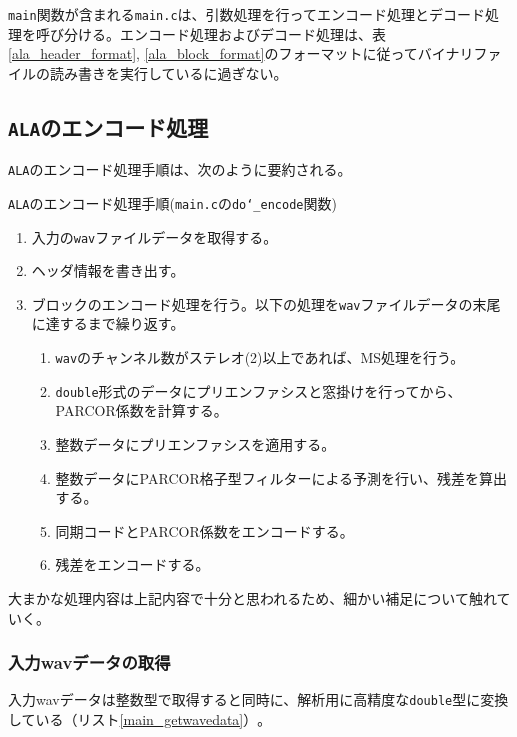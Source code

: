 \documentclass[uplatex,dvipdfmx,b5j,10pt]{jsbook}
\theoremstyle{definition}
\begin{document}
\texttt{main}関数が含まれる\texttt{main.c}は、引数処理を行ってエンコード処理とデコード処理を呼び分ける。エンコード処理およびデコード処理は、表\ref{ala_header_format}, \ref{ala_block_format}のフォーマットに従ってバイナリファイルの読み書きを実行しているに過ぎない。

\subsection{\texttt{ALA}のエンコード処理} \label{description_do_encode}

\texttt{ALA}のエンコード処理手順は、次のように要約される。

\begin{itembox}[l]{\texttt{ALA}のエンコード処理手順(\texttt{main.c}の\texttt{do\char`_encode}関数)}
  \begin{enumerate}
    \item 入力の\texttt{wav}ファイルデータを取得する。
    \item ヘッダ情報を書き出す。
    \item ブロックのエンコード処理を行う。以下の処理を\texttt{wav}ファイルデータの末尾に達するまで繰り返す。
      \begin{enumerate}
        \item \texttt{wav}のチャンネル数がステレオ(2)以上であれば、MS処理を行う。
        \item \texttt{double}形式のデータにプリエンファシスと窓掛けを行ってから、PARCOR係数を計算する。
        \item 整数データにプリエンファシスを適用する。
        \item 整数データにPARCOR格子型フィルターによる予測を行い、残差を算出する。
        \item 同期コードとPARCOR係数をエンコードする。
        \item 残差をエンコードする。
      \end{enumerate}
  \end{enumerate}
\end{itembox}

大まかな処理内容は上記内容で十分と思われるため、細かい補足について触れていく。

\subsubsection{入力wavデータの取得}

入力wavデータは整数型で取得すると同時に、解析用に高精度な\texttt{double}型に変換している（リスト\ref{main_getwavedata}）｡
\end{document}
